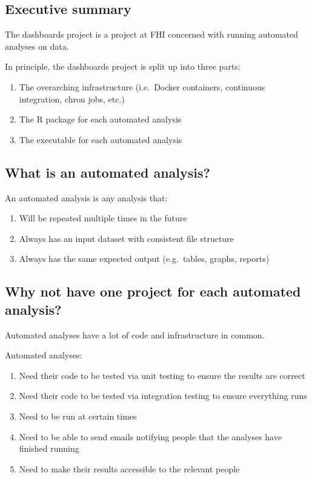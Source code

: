 \documentclass[12pt,]{article}
\providecommand{\tightlist}{%
  \setlength{\itemsep}{0pt}\setlength{\parskip}{0pt}}
\begin{document}
\subsection{Executive summary}\label{executive-summary-1}

The dashboards project is a project at FHI concerned with running
automated analyses on data.

In principle, the dashboards project is split up into three parts:

\begin{enumerate}
\def\labelenumi{\arabic{enumi}.}
\tightlist
\item
  The overarching infrastructure (i.e.~Docker containers, continuous
  integration, chron jobs, etc.)
\item
  The R package for each automated analysis
\item
  The executable for each automated analysis
\end{enumerate}

\subsection{What is an automated
analysis?}\label{what-is-an-automated-analysis-1}

An automated analysis is any analysis that:

\begin{enumerate}
\def\labelenumi{\arabic{enumi}.}
\tightlist
\item
  Will be repeated multiple times in the future
\item
  Always has an input dataset with consistent file structure
\item
  Always has the same expected output (e.g.~tables, graphs, reports)
\end{enumerate}

\subsection{Why not have one project for each automated
analysis?}\label{why-not-have-one-project-for-each-automated-analysis-1}

Automated analyses have a lot of code and infrastructure in common.

Automated analyses:

\begin{enumerate}
\def\labelenumi{\arabic{enumi}.}
\tightlist
\item
  Need their code to be tested via unit testing to ensure the results
  are correct
\item
  Need their code to be tested via integration testing to ensure
  everything runs
\item
  Need to be run at certain times
\item
  Need to be able to send emails notifying people that the analyses have
  finished running
\item
  Need to make their results accessible to the relevant people
\end{enumerate}
\end{document}

